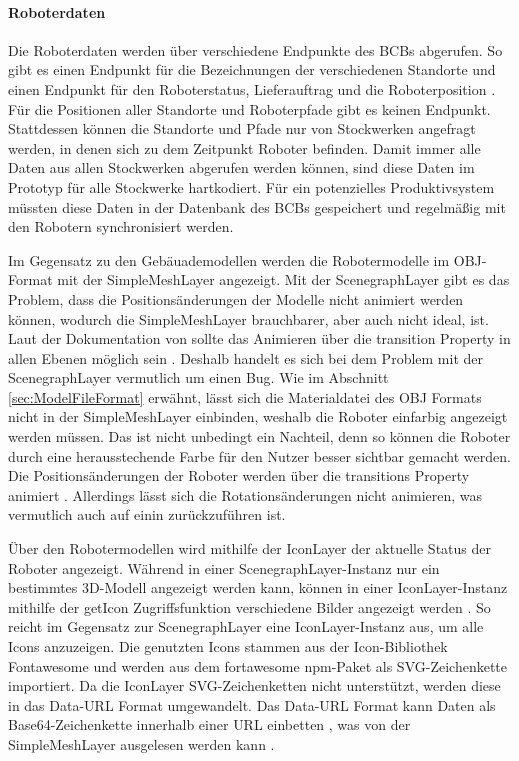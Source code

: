 \paragraph{Roboterdaten}\label{sec:RobotData}
Die Roboterdaten werden über verschiedene Endpunkte des \ac{BCB}s abgerufen. So gibt es einen Endpunkt für die Bezeichnungen der verschiedenen Standorte und einen Endpunkt für den Roboterstatus, Lieferauftrag und die Roboterposition \cite{BCBSwagger}. Für die Positionen aller Standorte und Roboterpfade gibt es keinen Endpunkt. Stattdessen können die Standorte und Pfade nur von Stockwerken angefragt werden, in denen sich zu dem Zeitpunkt Roboter befinden. Damit immer alle Daten aus allen Stockwerken abgerufen werden können, sind diese Daten im Prototyp für alle Stockwerke hartkodiert. Für ein potenzielles Produktivsystem müssten diese Daten in der Datenbank des \ac{BCB}s gespeichert und regelmäßig mit den Robotern synchronisiert werden.

Im Gegensatz zu den Gebäuademodellen werden die Robotermodelle im \ac{OBJ}-Format mit der SimpleMeshLayer \cite{DeckglSimpleMeshLayer} angezeigt. Mit der ScenegraphLayer gibt es das Problem, dass die Positionsänderungen der Modelle nicht animiert werden können, wodurch die SimpleMeshLayer brauchbarer, aber auch nicht ideal, ist. Laut der Dokumentation von \deckgl{} sollte das Animieren über die transition Property in allen Ebenen möglich sein \cite{DeckglLayerClass}. Deshalb handelt es sich bei dem Problem mit der ScenegraphLayer vermutlich um einen Bug. Wie im Abschnitt \ref{sec:ModelFileFormat} erwähnt, lässt sich die Materialdatei des \ac{OBJ} Formats nicht in der SimpleMeshLayer einbinden, weshalb die Roboter einfarbig angezeigt werden müssen. Das ist nicht unbedingt ein Nachteil, denn so können die Roboter durch eine herausstechende Farbe für den Nutzer besser sichtbar gemacht werden. Die Positionsänderungen der Roboter werden über die transitions Property animiert \cite{DeckglLayerClass}. Allerdings lässt sich die Rotationsänderungen nicht animieren, was vermutlich auch auf einin \deckgl{} zurückzuführen ist.

Über den Robotermodellen wird mithilfe der IconLayer der aktuelle Status der Roboter angezeigt. Während in einer ScenegraphLayer-Instanz nur ein bestimmtes 3D-Modell angezeigt werden kann, können in einer IconLayer-Instanz mithilfe der getIcon Zugriffsfunktion verschiedene Bilder angezeigt werden \cite{DeckglIconLayer}. So reicht im Gegensatz zur ScenegraphLayer eine IconLayer-Instanz aus, um alle Icons anzuzeigen. Die genutzten Icons stammen aus der Icon-Bibliothek Fontawesome und werden aus dem fortawesome \ac{npm}-Paket als \ac{SVG}-Zeichenkette importiert. Da die IconLayer \ac{SVG}-Zeichenketten nicht unterstützt, werden diese in das Data-\ac{URL} Format umgewandelt. Das Data-\ac{URL} Format kann Daten als \gls{Base64}-Zeichenkette innerhalb einer \ac{URL} einbetten \cite{DataUrlSpec}, was von der SimpleMeshLayer ausgelesen werden kann \cite{DeckglIconLayer}.


